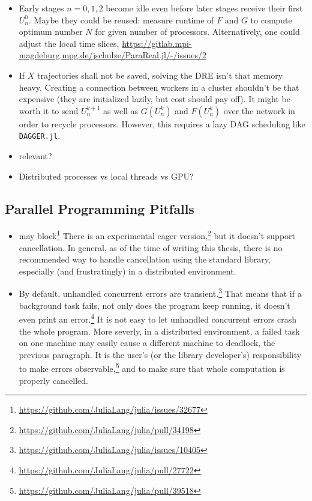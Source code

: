 \begin{itemize}
  \item
    Early stages $n=0,1,2$ become idle even before later stages receive their first $U^0_n$.
    Maybe they could be reused: measure runtime of $F$ and $G$ to compute optimum number $N$ for given number of processors.
    Alternatively, one could adjust the local time slices, \cf \url{https://gitlab.mpi-magdeburg.mpg.de/jschulze/ParaReal.jl/-/issues/2}
  \item
    If $X$ trajectories shall not be saved, solving the \ac{DRE} isn't that memory heavy.
    Creating a connection between workers in a cluster shouldn't be that expensive (they are initialized lazily, but cost should pay off).
    It might be worth it to send $U^{k+1}_n$ as well as $G(U^k_n)$ and $F(U^k_n)$ over the network in order to recycle processors.
    However, this requires a lazy DAG scheduling like \texttt{DAGGER.jl}.
  \item
    \cite[493]{Nielsen2018} relevant?
  \item
    Distributed processes vs local threads vs GPU?
\end{itemize}

\subsection{Parallel Programming Pitfalls}

\begin{itemize}
  \item
     may block\footnote{\url{https://github.com/JuliaLang/julia/issues/32677}}
    There is an experimental eager version,\footnote{\url{https://github.com/JuliaLang/julia/pull/34198}} but it doesn't support cancellation.
    In general, as of the time of writing this thesis,
    there is no recommended way to handle cancellation using the standard library,
    especially (and frustratingly) in a distributed environment.
  \item
    By default, unhandled concurrent errors are transient.\footnote{%
      \url{https://github.com/JuliaLang/julia/issues/10405}}
    That means that if a background task fails, not only does the program keep running, it doesn't even print an error.\footnote{%
      \url{https://github.com/JuliaLang/julia/pull/27722}}
    It is not easy to let unhandled concurrent errors crash the whole program.
    More severly, in a distributed environment, a failed task on one machine may easily cause a different machine to deadlock,
    \cf the previous paragraph.
    It is the user's (or the library developer's) responsibility to make errors observable,\footnote{%
      \url{https://github.com/JuliaLang/julia/pull/39518}}
    and to make sure that whole computation is properly cancelled.
\end{itemize}

